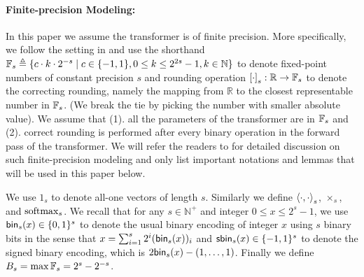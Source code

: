 \iffalse
\begin{definition}[Looped Transformer]\label{defi:looped_transformer}
Given number of loops $T\in\mathbb{N}^+$,  parameters $\theta = (\theta_{\tfblock},\theta_\tokenembedding,\theta_\posencoding,\theta_\transoutput)$, where $\theta_{\transformer} = (\theta^{(l)}_\mha,\theta^{(l)}_\ff )_{l=0}^{L-1}$, we define the \emph{looped transformer} as  $p_{\theta,T}\triangleq \transoutput_{\theta_\transoutput}\circ \left(\tfblock_{\theta_\tfblock}\right)^T\circ \embed_{\theta_\tokenembedding,\theta_\posencoding}$ and the corresponding deterministic version as $\transformer_{\theta,T}(v_1,\ldots,v_n) \triangleq \argmax_{v\in\mathcal{V}} p_{\theta,T}(v|v_1,\ldots,v_n)$.
\end{definition}
\fi



\paragraph{Finite-precision Modeling:} In this paper we assume the transformer is of finite precision. More specifically, we follow the setting in \citet{li2024chain} and use the shorthand $\mathbb{F}_{s}\triangleq \{c\cdot k\cdot 2^{-s}\mid c\in \{-1,1\}, 0\le k\le 2^{2s}-1, k\in\mathbb{N}\}$ to denote fixed-point numbers of constant precision $s$ and rounding operation $\left[\cdot\right]_s:\mathbb{R}\to \mathbb{F}_s$ to denote the correcting rounding, namely the mapping from $\mathbb{R}$ to the closest representable number in $\mathbb{F}_s$. (We break the tie by picking the number with smaller absolute value). We assume that (1). all the parameters of the transformer are in $\mathbb{F}_{s}$ and (2). correct rounding is performed after every binary operation in the forward pass of the transformer. We will refer the readers to \citet{li2024chain} for detailed discussion on such finite-precision modeling and only list important notations and lemmas that will be used in this paper below. 

We use $1_s$ to denote all-one vectors of length $s$. Similarly we define $\left\langle \cdot,\cdot \right\rangle_s$, $\times_s$, and $\mathrm{softmax}_s$. We recall that for any $s\in \mathbb{N}^+$ and integer $0\le x\le 2^s-1$, we use $\mathsf{bin}_s(x)\in\{0,1\}^s$ to denote the usual binary encoding of integer $x$ using $s$ binary bits in the sense that $x = \sum_{i=1}^s 2^i (\mathsf{bin}_s(x))_i$ and $\mathsf{sbin}_s(x)\in\{-1,1\}^s$ to denote the signed binary encoding, which is $2\mathsf{bin}_s(x)-(1,\ldots,1)$. Finally we define $B_s = \max \mathbb{F}_s = 2^s-2^{-s}$.



